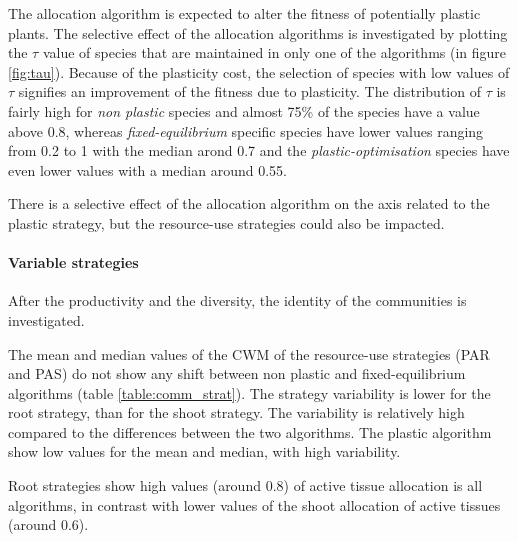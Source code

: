 The allocation algorithm is expected to alter the fitness of potentially plastic plants. The selective effect of the allocation algorithms is investigated by plotting the $\tau$ value of species that are maintained in only one of the algorithms (in figure \ref{fig:tau}). Because of the plasticity cost, the selection of species with low values of $\tau$ signifies an improvement of the fitness due to plasticity. The distribution of $\tau$ is fairly high for \textit{non plastic} species and almost 75\% of the species have a value above 0.8, whereas \textit{fixed-equilibrium} specific species have lower values ranging from 0.2 to 1 with the median arond 0.7 and the \textit{plastic-optimisation} species have even lower values with a median around 0.55.



There is a selective effect of the allocation algorithm on the axis related to the plastic strategy, but the resource-use strategies could also be impacted.


\paragraph{Variable strategies}

After the productivity and the diversity, the identity of the communities is investigated.

The mean and median values of the CWM of the resource-use strategies (PAR and PAS) do not show any shift between non plastic and fixed-equilibrium algorithms (table \ref{table:comm_strat}). The strategy variability is lower for the root strategy, than for the shoot strategy. The variability is relatively high compared to the differences between the two algorithms. The plastic algorithm show low values for the mean and median, with high variability.

Root strategies show high values (around 0.8) of active tissue allocation is all algorithms, in contrast with lower values of the shoot allocation of active tissues (around 0.6).

